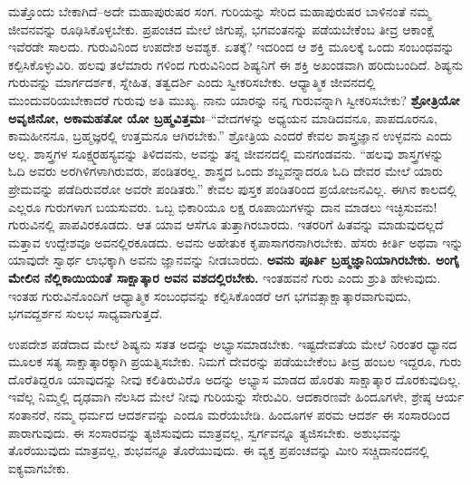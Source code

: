ಮತ್ತೊಂದು ಬೇಕಾಗಿದೆ–ಅದೇ ಮಹಾಪುರುಷರ ಸಂಗ. ಗುರಿಯನ್ನು ಸೇರಿದ ಮಹಾಪುರುಷರ ಬಾಳಿನಂತೆ ನಮ್ಮ ಜೀವನವನ್ನು ರೂಢಿಸಿಕೊಳ್ಳಬೇಕು. ಪ್ರಪಂಚದ ಮೇಲೆ ಜಿಗುಪ್ಸೆ, ಭಗವಂತನನ್ನು ಪಡೆಯಬೇಕೆಂಬ ತೀವ್ರ ಆಕಾಂಕ್ಷೆ ಇವೆರಡೇ ಸಾಲದು. ಗುರುವಿನಿಂದ ಉಪದೇಶ ಅವಶ್ಯಕ. ಏತಕ್ಕೆ? ಇದರಿಂದ ಆ ಶಕ್ತಿ ಮೂಲಕ್ಕೆ ಒಂದು ಸಂಬಂಧವನ್ನು ಕಲ್ಪಿಸಿಕೊಳ್ಳುವಿರಿ. ಹಲವು ತಲೆಮಾರು ಗಳಿಂದ ಗುರುವಿನಿಂದ ಶಿಷ್ಯನಿಗೆ ಈ ಶಕ್ತಿ ಅಖಂಡವಾಗಿ ಹರಿದುಬಂದಿದೆ. ಶಿಷ್ಯನು ಗುರುವನ್ನು ಮಾರ್ಗದರ್ಶಕ, ಸ್ನೇಹಿತ, ತತ್ವದರ್ಶಿ ಎಂದು ಸ್ವೀಕರಿಸಬೇಕು. ಆಧ್ಯಾತ್ಮಿಕ ಜೀವನದಲ್ಲಿ ಮುಂದುವರಿಯಬೇಕಾದರೆ ಗುರುವು ಅತಿ ಮುಖ್ಯ. ನಾನು ಯಾರನ್ನು ನನ್ನ ಗುರುವನ್ನಾಗಿ ಸ್ವೀಕರಿಸಬೇಕು? \textbf{ಶ್ರೋತ್ರಿಯೋ ಅವೃಜಿನೋ, ಅಕಾಮಹತೋ ಯೋ ಬ್ರಹ್ಮವಿತ್ತಮಃ}–“ವೇದಗಳನ್ನು ಅಧ್ಯಯನ ಮಾಡಿದವನೂ, ಪಾಪದೂರನೂ, ಕಾಮಹೀನನೂ, ಬ್ರಹ್ಮಜ್ಞರಲ್ಲಿ ಉತ್ತಮನೂ ಆಗಿರಬೇಕು.” ಶ್ರೋತ್ರಿಯ ಎಂದರೆ ಕೇವಲ ಶಾಸ್ತ್ರಜ್ಞಾನ ಉಳ್ಳವನು ಎಂದು ಅಲ್ಲ. ಶಾಸ್ತ್ರಗಳ ಸೂಕ್ಷ್ಮರಹಸ್ಯವನ್ನು ತಿಳಿದವನು, ಅವನ್ನು ತನ್ನ ಜೀವನದಲ್ಲಿ ಮನಗಂಡವನು. “ಹಲವು ಶಾಸ್ತ್ರಗಳನ್ನು ಓದಿ ಅವರು ಅರಗಿಳಿಗಳಾಗಿರುವರು, ಪಂಡಿತರಲ್ಲ. ಶಾಸ್ತ್ರದ ಒಂದು ಶಬ್ದವನ್ನಾದರೂ ಓದಿ ದೇವರ ಮೇಲೆ ಯಾರು ಪ್ರೇಮವನ್ನು ಪಡೆದಿರುವರೋ ಅವರೇ ಪಂಡಿತರು.” ಕೇವಲ ಪುಸ್ತಕ ಪಂಡಿತರಿಂದ ಪ್ರಯೋಜನವಿಲ್ಲ. ಈಗಿನ ಕಾಲದಲ್ಲಿ ಎಲ್ಲರೂ ಗುರುಗಳಾಗ ಬಯಸುವರು. ಒಬ್ಬ ಭಿಕಾರಿಯೂ ಲಕ್ಷ ರೂಪಾಯಿಗಳನ್ನು ದಾನ ಮಾಡಲು ಇಚ್ಛಿಸುವನು! ಗುರುವಿನಲ್ಲಿ ಪಾಪವಿರಕೂಡದು. ಆತ ಯಾವ ಆಸೆಗೂ ತುತ್ತಾಗಿರಬಾರದು. ಇತರರಿಗೆ ಹಿತವನ್ನು ಮಾಡುವುದಲ್ಲದೆ ಮತ್ತಾವ ಉದ್ದೇಶವೂ ಅವನಲ್ಲಿರಕೂಡದು. ಅವನು ಅಹೇತುಕ ಕೃಪಾಸಾಗರನಾಗಿರಬೇಕು. ಹೆಸರು ಕೀರ್ತಿ ಅಥವಾ ಇನ್ನು ಯಾವುದೇ ಸ್ವಾರ್ಥ ಲಾಭಕ್ಕಾಗಿ ಅವನು ಜ್ಞಾನವನ್ನು ನೀಡಬಾರದು. \textbf{ಅವನು ಪೂರ್ತಿ ಬ್ರಹ್ಮಜ್ಞಾನಿಯಾಗಿರಬೇಕು. ಅಂಗೈ ಮೇಲಿನ ನೆಲ್ಲಿಕಾಯಿಯಂತೆ ಸಾಕ್ಷಾತ್ಕಾರ ಅವನ ವಶದಲ್ಲಿರಬೇಕು. } ಇಂತಹವನೆ ಗುರು ಎಂದು ಶ್ರುತಿ ಹೇಳುವುದು. ಇಂತಹ ಗುರುವಿನೊಂದಿಗೆ ಆಧ್ಯಾತ್ಮಿಕ ಸಂಬಂಧವನ್ನು ಕಲ್ಪಿಸಿಕೊಂಡರೆ ಆಗ ಭಗವತ್ಸಾಕ್ಷಾತ್ಕಾರವಾಗುವುದು, ಭಗವದ್ದರ್ಶನ ಸುಲಭ ಸಾಧ್ಯವಾಗುತ್ತದೆ. 

ಉಪದೇಶ ಪಡೆದಾದ ಮೇಲೆ ಶಿಷ್ಯನು ಸತತ ಅದನ್ನು ಅಭ್ಯಾಸಮಾಡಬೇಕು. ಇಷ್ಟದೇವತೆಯ ಮೇಲೆ ನಿರಂತರ ಧ್ಯಾನದ ಮೂಲಕ ಸತ್ಯ ಸಾಕ್ಷಾತ್ಕಾರಕ್ಕಾಗಿ ಪ್ರಯತ್ನಿಸಬೇಕು. ನಿಮಗೆ ದೇವರನ್ನು ಪಡೆಯಬೇಕೆಂಬ ತೀವ್ರ ಹಂಬಲ ಇದ್ದರೂ, ಗುರು ದೊರೆತಿದ್ದರೂ ಯಾವುದನ್ನು ನೀವು ಕಲಿತಿರುವಿರೊ ಅದನ್ನು ಅಭ್ಯಾಸ ಮಾಡದ ಹೊರತು ಸಾಕ್ಷಾತ್ಕಾರ ದೊರಕುವುದಿಲ್ಲ. ಇವೆಲ್ಲ ನಿಮ್ಮಲ್ಲಿ ದೃಢವಾಗಿ ನೆಲಸಿದ ಮೇಲೆ ನೀವು ಗುರಿಯನ್ನು ಸೇರುವಿರಿ. ಆದಕಾರಣವೇ ಹಿಂದೂಗಳೇ, ಶ್ರೇಷ್ಠ ಆರ್ಯ ಸಂತಾನರೆ, ನಮ್ಮ ಧರ್ಮದ ಆದರ್ಶವನ್ನು ಎಂದೂ ಮರೆಯಬೇಡಿ. ಹಿಂದೂಗಳ ಪರಮ ಆದರ್ಶ ಈ ಸಂಸಾರದಿಂದ ಪಾರಾಗುವುದು. ಈ ಸಂಸಾರವನ್ನು ತ್ಯಜಿಸುವುದು ಮಾತ್ರವಲ್ಲ, ಸ್ವರ್ಗವನ್ನೂ ತ್ಯಜಿಸಬೇಕು. ಅಶುಭವನ್ನು ತೊರೆಯುವುದು ಮಾತ್ರವಲ್ಲ, ಶುಭವನ್ನೂ ತೊರೆಯುವುದು. ಈ ವ್ಯಕ್ತ ಪ್ರಪಂಚವನ್ನು ಮೀರಿ ಸಚ್ಚಿದಾನಂದನಲ್ಲಿ ಐಕ್ಯವಾಗಬೇಕು. 

